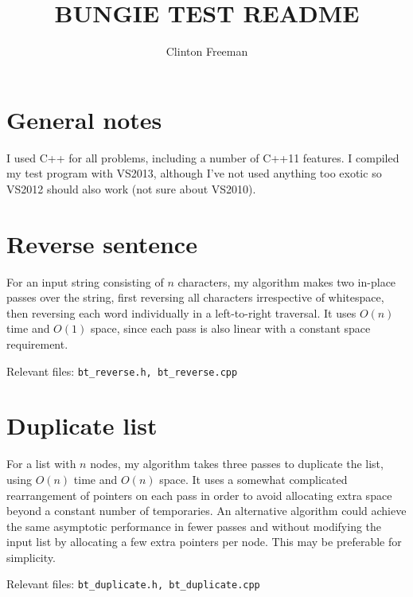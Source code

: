 \documentclass{article}
\begin{document}
\title{BUNGIE TEST README}
\author{Clinton Freeman}

\maketitle

\section{General notes}


I used C++ for all problems, including a number of C++11 features. I compiled my
test program with VS2013, although I've not used anything too exotic so VS2012
should also work (not sure about VS2010).

\section{Reverse sentence}

For an input string consisting of $n$ characters, my algorithm makes two
in-place passes over the string, first reversing all characters irrespective of
whitespace, then reversing each word individually in a left-to-right traversal.
It uses $O(n)$ time and $O(1)$ space, since each pass is also linear with a
constant space requirement.

\vspace{1em}
\noindent Relevant files: \texttt{bt\_reverse.h, bt\_reverse.cpp} 

\section{Duplicate list}

For a list with $n$ nodes, my algorithm takes three passes to duplicate the
list, using $O(n)$ time and $O(n)$ space. It uses a somewhat complicated
rearrangement of pointers on each pass in order to avoid allocating extra space
beyond a constant number of temporaries. An alternative algorithm could achieve
the same asymptotic performance in fewer passes and without modifying the input
list by allocating a few extra pointers per node. This may be preferable for
simplicity.

\vspace{1em}
\noindent Relevant files: \texttt{bt\_duplicate.h, bt\_duplicate.cpp}
\end{document}
